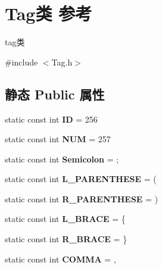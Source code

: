 \hypertarget{class_tag}{}\section{Tag类 参考}
\label{class_tag}


tag类  




{\ttfamily \#include $<$Tag.\+h$>$}

\subsection*{静态 Public 属性}
\begin{DoxyCompactItemize}
\item 
\mbox{\label{class_tag_acdf9d38c11c7dff1026caea53454d62c}} 
static const int {\bfseries ID} = 256
\item 
\mbox{\label{class_tag_a37bd7cc8cc362fca325f553b2844d745}} 
static const int {\bfseries N\+UM} = 257
\item 
\mbox{\label{class_tag_a383b3b3d27ad94992a9345cf51632f31}} 
static const int {\bfseries Semicolon} = \textquotesingle{};\textquotesingle{}
\item 
\mbox{\label{class_tag_a3f592bff8a566859e6953cd380e809e7}} 
static const int {\bfseries L\+\_\+\+P\+A\+R\+E\+N\+T\+H\+E\+SE} = \textquotesingle{}(\textquotesingle{}
\item 
\mbox{\label{class_tag_a06f70b28d8eb3e9f3d2d7dcc6a318fee}} 
static const int {\bfseries R\+\_\+\+P\+A\+R\+E\+N\+T\+H\+E\+SE} = \textquotesingle{})\textquotesingle{}
\item 
\mbox{\label{class_tag_a27f8b6e653f63d5a04cbf773d7aef40d}} 
static const int {\bfseries L\+\_\+\+B\+R\+A\+CE} = \textquotesingle{}\{\textquotesingle{}
\item 
\mbox{\label{class_tag_ac75cf51168e5f889ec56a8e5cebc4483}} 
static const int {\bfseries R\+\_\+\+B\+R\+A\+CE} = \textquotesingle{}\}\textquotesingle{}
\item 
\mbox{\label{class_tag_ad0218cdf6f9bc11b27aa07dc789e0a2c}} 
static const int {\bfseries C\+O\+M\+MA} = \textquotesingle{},\textquotesingle{}

\end{DoxyCompactItemize}
